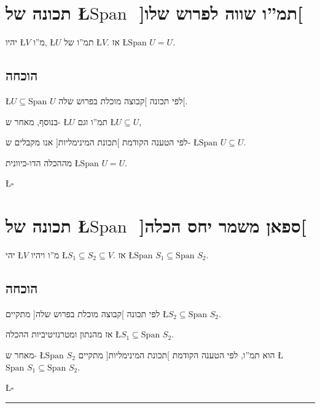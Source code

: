 \documentclass[english,hebrew]{article}
\newcommand{\spn}{\text{Span }}
\begin{document}
\section{תכונה {\endL} של \L{$\spn$} {]}תמ\textquotedblright ו שווה
לפרוש שלו{[}}

יהיו \L{$V$} מ\textquotedblright ו, \L{$U$} תמ\textquotedblright ו
של \L{$V$}. אז \L{$\spn U=U$}.

\subsection{הוכחה}

\L{$U\subseteq\spn U$} לפי תכונה {\endL} {]}קבוצה מוכלת
בפרוש שלה{[}.

בנוסף, מאחר ש- \L{$U$} תמ\textquotedblright ו וגם \L{$U\subseteq U$},

לפי הטענה הקודמת {]}תכונת המינימליות{[} אנו מקבלים ש- \L{$\spn U\subseteq U$}.

מההכלה הדו-כיוונית \L{$\spn U=U$}.
\begin{flushright}
\L{$\square$}
\par\end{flushright}

\section{תכונה {\endL} של \L{$\spn$} {]}ספאן משמר יחס הכלה{[}}

יהי \L{$V$} מ\textquotedblright ו ויהיו \L{$S_{1}\subseteq S_{2}\subseteq V$}.
אז \L{$\spn S_{1}\subseteq\spn S_{2}$}.

\subsection{הוכחה}

לפי תכונה {\endL} {]}קבוצה מוכלת בפרוש שלה{[} מתקיים \L{$S_{2}\subseteq\spn S_{2}$}.

אז מהנתון ומטרנזיטיביות ההכלה \L{$S_{1}\subseteq\spn S_{2}$}.

מאחר ש- \L{$\spn S_{2}$} הוא תמ\textquotedblright ו, לפי הטענה הקודמת
{]}תכונת המינימליות{[} מתקיים \L{$\spn S_{1}\subseteq\spn S_{2}$}.
\begin{flushright}
\L{$\square$}
\par\end{flushright}

\medskip{}

\rule[0.5ex]{1\columnwidth}{1pt}
\end{document}
